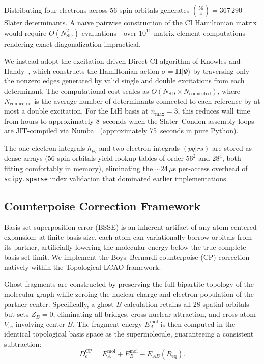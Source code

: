 \documentclass[aps,pra,twocolumn,superscriptaddress,longbibliography]{revtex4-2}
\begin{document}
Distributing four electrons across 56 spin-orbitals generates
$\binom{56}{4} = 367\,290$ Slater determinants.  A na\"ive pairwise
construction of the CI Hamiltonian matrix would require
$O(N_{\mathrm{SD}}^2)$ evaluations---over $10^{11}$ matrix element
computations---rendering exact diagonalization impractical.

We instead adopt the excitation-driven Direct CI algorithm of Knowles
and Handy~\cite{knowles_handy}, which constructs the Hamiltonian action
$\sigma = \mathbf{H}|\Psi\rangle$ by traversing only the nonzero edges
generated by valid single and double excitations from each determinant.
The computational cost scales as
$O(N_{\mathrm{SD}} \times N_{\mathrm{connected}})$, where
$N_{\mathrm{connected}}$ is the average number of determinants connected
to each reference by at most a double excitation.  For the LiH basis at
$n_{\max}=3$, this reduces wall time from hours to approximately
8~seconds when the Slater--Condon assembly loops are JIT-compiled
via Numba~\cite{numba} (approximately 75~seconds in pure Python).

The one-electron integrals $h_{pq}$ and two-electron integrals
$(pq|rs)$ are stored as dense arrays (56 spin-orbitals yield lookup
tables of order $56^2$ and $28^4$, both fitting comfortably in memory),
eliminating the $\sim\!24\,\mu$s per-access overhead of
\texttt{scipy.sparse} index validation that dominated earlier
implementations.

\subsection{Counterpoise Correction Framework}
\label{sec:cp}

Basis set superposition error (BSSE) is an inherent artifact of any
atom-centered expansion: at finite basis size, each atom can
variationally borrow orbitals from its partner, artificially lowering
the molecular energy below the true complete-basis-set limit.  We
implement the Boys--Bernardi counterpoise (CP)
correction~\cite{boys_bernardi} natively within the Topological LCAO
framework.

Ghost fragments are constructed by preserving the full bipartite
topology of the molecular graph while zeroing the nuclear charge and
electron population of the partner center.  Specifically, a ghost-$B$
calculation retains all 28 spatial orbitals but sets $Z_B=0$,
eliminating all bridges, cross-nuclear attraction, and cross-atom
$V_{ee}$ involving center $B$.  The fragment energy
$E_A^{\mathrm{mol}}$ is then computed in the identical topological basis
space as the supermolecule, guaranteeing a consistent subtraction:
\begin{equation}
D_e^{\mathrm{CP}} = E_A^{\mathrm{mol}} + E_B^{\mathrm{mol}} -
E_{AB}(R_{\mathrm{eq}}).
\label{eq:cp}
\end{equation}
\end{document}
